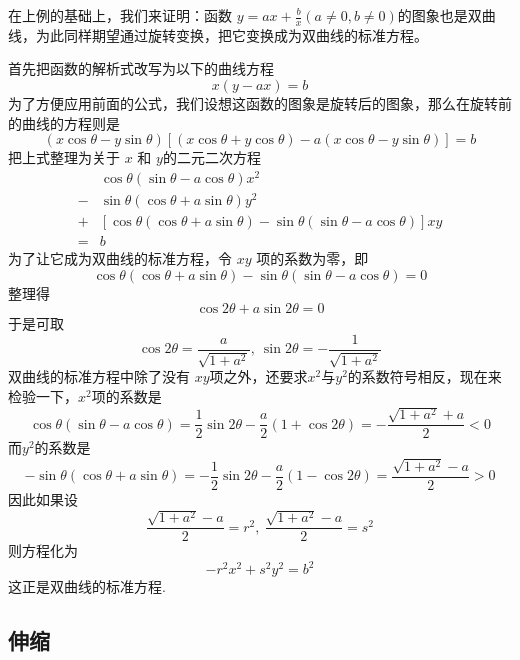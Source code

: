 \begin{example}
  在上例的基础上，我们来证明：函数 $y=ax+\frac{b}{x}(a \neq 0, b \neq 0)$的图象也是双曲线，为此同样期望通过旋转变换，把它变换成为双曲线的标准方程。

  首先把函数的解析式改写为以下的曲线方程
  \[ x(y-ax)=b \]
  为了方便应用前面的公式，我们设想这函数的图象是旋转后的图象，那么在旋转前的曲线的方程则是
  \[ (x\cos{\theta}-y\sin{\theta})[(x\cos{\theta}+y\cos{\theta})-a(x\cos{\theta}-y\sin{\theta})]=b \]
  把上式整理为关于 $x$ 和 $y$的二元二次方程
  \begin{equation*}
    \begin{split}
      & \cos{\theta}(\sin{\theta}-a\cos{\theta})x^2 \\
      - & \sin{\theta}(\cos{\theta}+a\sin{\theta})y^2 \\
      + & [\cos{\theta}(\cos{\theta}+a\sin{\theta})-\sin{\theta}(\sin{\theta}-a\cos{\theta})]xy \\
      = & b
    \end{split}
  \end{equation*}
  为了让它成为双曲线的标准方程，令 $xy$ 项的系数为零，即
  \[ \cos{\theta}(\cos{\theta}+a\sin{\theta})-\sin{\theta}(\sin{\theta}-a\cos{\theta}) = 0 \]
  整理得
  \[ \cos{2\theta}+a\sin{2\theta}=0 \]
  于是可取
  \[ \cos{2\theta} = \frac{a}{\sqrt{1+a^2}}, \  \sin{2\theta}=-\frac{1}{\sqrt{1+a^2}} \]
  双曲线的标准方程中除了没有 $xy$项之外，还要求$x^2$与$y^2$的系数符号相反，现在来检验一下，$x^2$项的系数是
  \[ \cos{\theta}(\sin{\theta}-a\cos{\theta})=\frac{1}{2}\sin{2\theta}-\frac{a}{2}(1+\cos{2\theta}) = -\frac{\sqrt{1+a^2}+a}{2}<0 \]
  而$y^2$的系数是
  \[ -\sin{\theta}(\cos{\theta}+a\sin{\theta})=-\frac{1}{2}\sin{2\theta}-\frac{a}{2}(1-\cos{2\theta})=\frac{\sqrt{1+a^2}-a}{2}>0 \]
  因此如果设
  \[\frac{\sqrt{1+a^2}-a}{2}=r^2, \  \frac{\sqrt{1+a^2}-a}{2}=s^2 \]
  则方程化为
  \[ -r^2x^2+s^2y^2=b^2 \]
  这正是双曲线的标准方程.
\end{example}

\subsection{伸缩}

